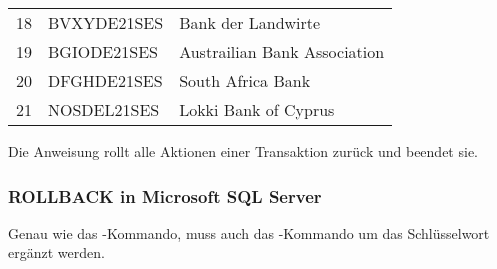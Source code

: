           \begin{center}
            \begin{small}
              \tablehead{}
              \begin{msoraclesql}
                \begin{supertabular}{rll}
                  18 & BVXYDE21SES & Bank der Landwirte \\
                  19 & BGIODE21SES & Austrailian Bank Association \\
                  20 & DFGHDE21SES & South Africa Bank \\
                  21 & NOSDEL21SES & Lokki Bank of Cyprus \\
                \end{supertabular}
              \end{msoraclesql}
            \end{small}
          \end{center}
          \begin{merke}
            Die Anweisung \ROLLBACK{} rollt alle Aktionen einer Transaktion
            zurück und beendet sie.
          \end{merke}
        \subsubsection{ROLLBACK in Microsoft SQL Server}
          Genau wie das \COMMIT-Kommando, muss auch das \ROLLBACK-Kommando um
          das Schlüsselwort  ergänzt werden.
